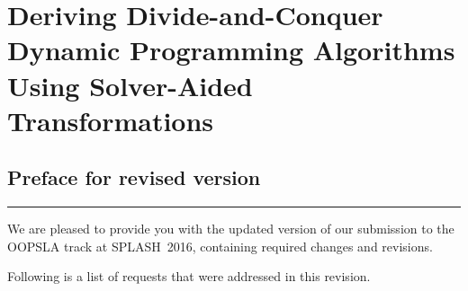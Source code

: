 \documentclass{article}
\begin{document}
\section*{Deriving Divide-and-Conquer Dynamic Programming Algorithms Using 
  Solver-Aided Transformations}
\subsection*{Preface for revised version}

\hrule

\bigskip

We are pleased to provide you with the updated version of our submission to the OOPSLA track at SPLASH~2016,
containing required changes and revisions.

\bigskip
Following is a list of requests that were addressed in this revision.
\end{document}
